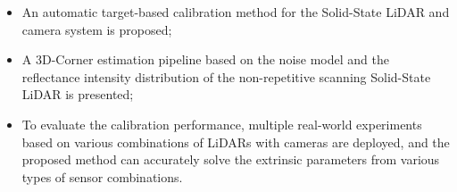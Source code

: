 \documentclass[journal]{vgtc}
\begin{document}



\begin{itemize}{}
	\item An automatic target-based calibration method for the Solid-State LiDAR and camera system is proposed;
	\item A 3D-Corner estimation pipeline based on the noise model and the reflectance intensity distribution of the non-repetitive scanning Solid-State LiDAR is presented;
	\item To evaluate the calibration performance, multiple real-world experiments based on various combinations of LiDARs with cameras are deployed, and the proposed method can accurately solve the extrinsic parameters from various types of sensor combinations.
\end{itemize}



\end{document}
